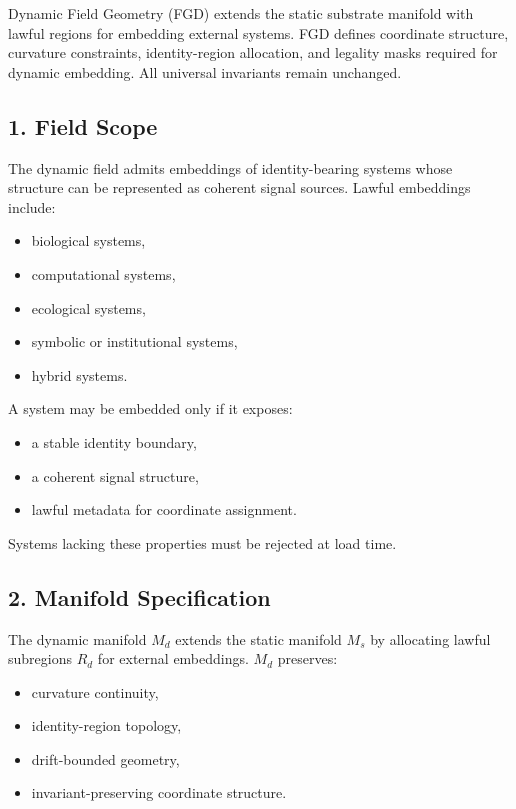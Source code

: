 Dynamic Field Geometry (FGD) extends the static substrate manifold with lawful
regions for embedding external systems. FGD defines coordinate structure,
curvature constraints, identity-region allocation, and legality masks required
for dynamic embedding. All universal invariants remain unchanged.

\subsection*{1. Field Scope}
\label{boot:fgd_scope}

The dynamic field admits embeddings of identity-bearing systems whose structure
can be represented as coherent signal sources. Lawful embeddings include:
\begin{itemize}[leftmargin=1.2cm]
    \item biological systems,
    \item computational systems,
    \item ecological systems,
    \item symbolic or institutional systems,
    \item hybrid systems.
\end{itemize}

A system may be embedded only if it exposes:
\begin{itemize}[leftmargin=1.2cm]
    \item a stable identity boundary,
    \item a coherent signal structure,
    \item lawful metadata for coordinate assignment.
\end{itemize}

Systems lacking these properties must be rejected at load time.

\subsection*{2. Manifold Specification}
\label{boot:fgd_manifold}

The dynamic manifold $M_d$ extends the static manifold $M_s$ by allocating
lawful subregions $R_d$ for external embeddings. $M_d$ preserves:
\begin{itemize}[leftmargin=1.2cm]
    \item curvature continuity,
    \item identity-region topology,
    \item drift-bounded geometry,
    \item invariant-preserving coordinate structure.
\end{itemize}

